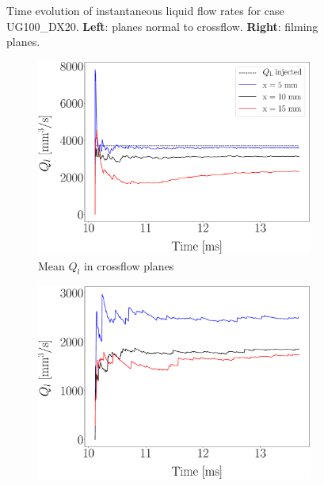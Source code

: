 \begin{figure}[ht]
\begin{subfigure}[b]{0.45\textwidth}
\end{subfigure}
\caption{Time evolution of instantaneous liquid flow rates for case UG100\_DX20. \textbf{Left}: planes normal to crossflow. \textbf{Right}: filming planes.}
\label{fig:IB_liquid_flow_rate_inst_evolution_UG100_DX20}
\end{figure}

\newpage

\begin{figure}[ht]
\centering
\begin{subfigure}[b]{0.45\textwidth}
	\centering
   \includegraphics[scale=0.17]{./part2_developments/figures_ch5_resolved_JICF/flow_rates_ibs/uG100_dx20_QL_isox_mean_time_convergence.eps}
   \caption{Mean $Q_l$ in crossflow planes}
\end{subfigure}
\hfill
\begin{subfigure}[b]{0.45\textwidth}
	\centering
   \includegraphics[scale=0.17]{./part2_developments/figures_ch5_resolved_JICF/flow_rates_ibs/uG100_dx20_QL_isox_RMS_time_convergence.eps}

\end{subfigure}
\end{figure}
